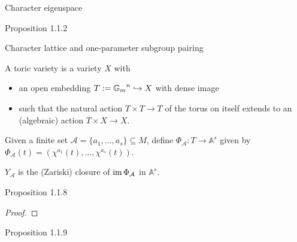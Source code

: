 \begin{definition}
  \label{char_eigenspace}
  Character eigenspace
\end{definition}

\begin{proposition}
  \label{prop:1.1.2}
  Proposition 1.1.2
\end{proposition}

\begin{definition}
  \label{char_ops_pairing}
  Character lattice and one-parameter subgroup pairing
\end{definition}

\begin{definition}
  \label{ToricVariety}
  \leanok
  A toric variety is a variety \(X\) with
  \begin{itemize}
    \item an open embedding \(T := {\mathbb G_m}^n \hookrightarrow X\) with dense image
    \item such that the natural action \(T \times T \to T\) of the torus on itself extends to an (algebraic) action \(T \times X \to X\).
  \end{itemize}
\end{definition}

\begin{definition}
  \label{phiA}
  Given a finite set \(\mathcal A = \{a_1, \dotsc, a_s\} \subseteq M\), define \(\Phi_{\mathcal{A}} : T \to \mathbb A^s\) given by \(\Phi_{\mathcal A} (t) = (\chi^{a_1} (t), \dotsc, \chi^{a_s} (t))\).
\end{definition}

\begin{definition}
  \label{YA}
  \(Y_{\mathcal{A}}\) is the (Zariski) closure of \(\operatorname{im} \Phi_{\mathcal A}\) in \(\mathbb A^s\).
\end{definition}

\begin{proposition}
  \label{prop:1.1.8}
  Proposition 1.1.8
\end{proposition}
\begin{proof}
\end{proof}

\begin{proposition}
  \label{prop:1.1.9}
  Proposition 1.1.9
\end{proposition}

